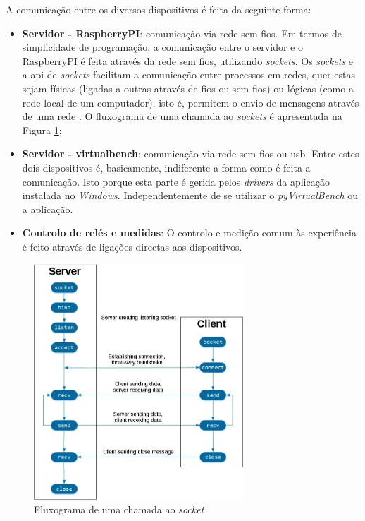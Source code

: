 A comunicação entre os diversos dispositivos é feita da seguinte forma:
\begin{itemize}
    \item \textbf{Servidor - \gls{RaspberryPI}}: comunicação via rede sem fios. Em termos de simplicidade de programação, a comunicação entre o servidor e o \gls{RaspberryPI} é feita através da rede sem fios, utilizando \textit{sockets}. Os \textit{sockets} e a \acrshort{api} de \textit{sockets} facilitam a comunicação entre processos em redes, quer estas sejam físicas (ligadas a outras através de fios ou sem fios) ou lógicas (como a rede local de um computador), isto é, permitem o envio de mensagens através de uma rede \cite{Sockets}. O fluxograma de uma chamada ao \textit{sockets} é apresentada na Figura \ref{fig:fluxogramasockets};
    \item \textbf{Servidor - \acrshort{virtualbench}}: comunicação via rede sem fios ou \acrshort{usb}. Entre estes dois dispositivos é, basicamente, indiferente a forma como é feita a comunicação. Isto porque esta parte é gerida pelos \textit{drivers} da aplicação instalada no \textit{Windows}. Independentemente de se utilizar o \textit{pyVirtualBench} ou a aplicação.
    \item \textbf{Controlo de relés e medidas}: O controlo e medição comum às experiência é feito através de ligações directas aos dispositivos.
\end{itemize}

\begin{figure}[hbtp]
    \centering
    \includegraphics[width=0.7\textwidth]{figures/socketsdiagrama.png}
    \caption{Fluxograma de uma chamada ao \textit{socket} \cite{Sockets}}
    \label{fig:fluxogramasockets}
\end{figure}

